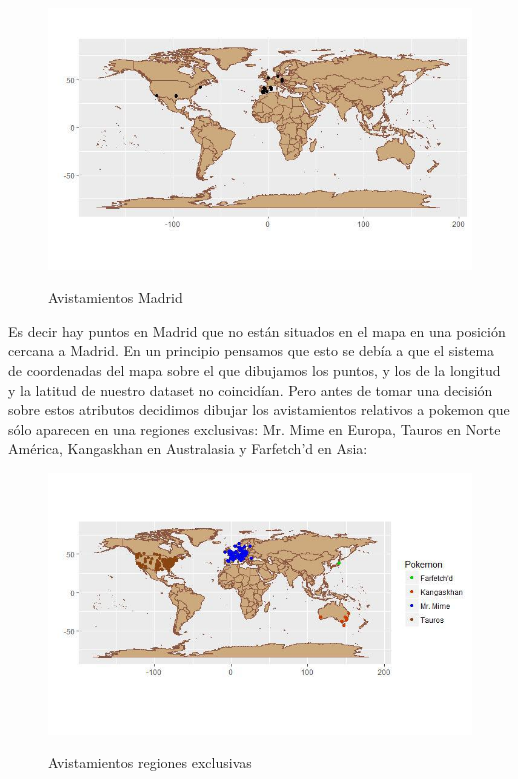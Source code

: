 \begin{figure}[H] %
\centering
\includegraphics[scale=0.8]{img/madrid.jpg}  %
\label{img/madrid.jpg}
\caption{Avistamientos Madrid}
\end{figure}

Es decir hay puntos en Madrid que no están situados en el mapa en una posición cercana a Madrid. En un principio pensamos que esto se debía a que el sistema de coordenadas del mapa sobre el que dibujamos los puntos, y los de la longitud y la latitud de nuestro dataset no coincidían. Pero antes de tomar una decisión sobre estos atributos decidimos dibujar los avistamientos relativos a pokemon que sólo aparecen en una regiones exclusivas: Mr. Mime en Europa, Tauros en Norte América, Kangaskhan en Australasia y Farfetch'd en Asia:

\begin{figure}[H] %
\centering
\includegraphics[scale=0.8]{img/exclusivos.jpg}  %
\label{img/exclusivos.jpg}
\caption{Avistamientos regiones exclusivas}
\end{figure}

